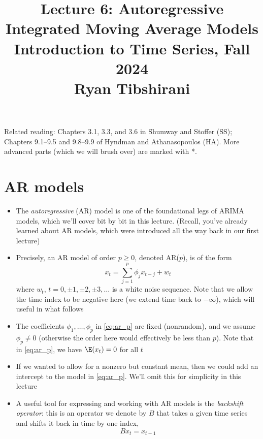 \documentclass{article}
\title{Lecture 6: Autoregressive Integrated Moving Average Models \\ \smallskip  
\large Introduction to Time Series, Fall 2024 \\ \smallskip
Ryan Tibshirani}
\date{}
\begin{document}
\maketitle
\RaggedRight
\vspace{-50pt}

Related reading: Chapters 3.1, 3.3, and 3.6 in Shumway and Stoffer (SS);
Chapters 9.1--9.5 and 9.8--9.9 of Hyndman and Athanasopoulos (HA). More advanced 
parts (which we will brush over) are marked with *.  

\section{AR models}

\begin{itemize}
\item The \emph{autoregressive} (AR) model is one of the foundational legs of
  ARIMA models, which we'll cover bit by bit in this lecture. (Recall, you've
  already learned about AR models, which were introduced all the way back in our 
  first lecture)  

\item Precisely, an AR model of order $p \geq 0$, denoted AR($p$), is of the
  form 
  \begin{equation}
  \label{eq:ar_p}
  x_t = \sum_{j=1}^p \phi_j x_{t-j} + w_t
  \end{equation}
  where $w_t$, $t = 0, \pm 1, \pm 2, \pm 3, \dots$ is a white noise
  sequence. Note that we allow the time index to be negative here (we extend
  time back to $-\infty$), which will useful in what follows 

\item The coefficients $\phi_1,\dots,\phi_p$ in \eqref{eq:ar_p} are fixed
  (nonrandom), and we assume $\phi_p \not= 0$ (otherwise the order here would
  effectively be less than $p$). Note that in \eqref{eq:ar_p}, we have $\E(x_t)
  = 0$ for all $t$

\item If we wanted to allow for a nonzero but constant mean, then we could add
  an intercept to the model in \eqref{eq:ar_p}. We'll omit this for simplicity
  in this lecture  

\item A useful tool for expressing and working with AR models is the
  \emph{backshift operator}: this is an operator we denote by $B$ that takes a 
  given time series and shifts it back in time by one index,
  \[
  B x_t = x_{t-1}
  \]


\end{itemize}
\end{document}
